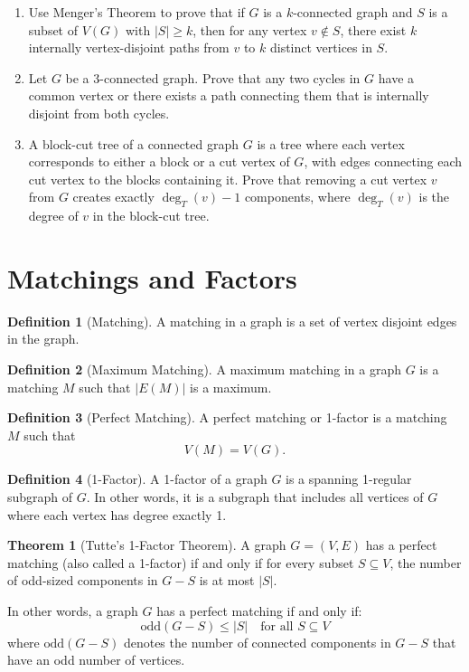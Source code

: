 \documentclass{article}
\theoremstyle{definition}
\newtheorem{theorem}{Theorem}
\newtheorem{definition}{Definition}
\begin{document}
\begin{enumerate}
\item Use Menger's Theorem to prove that if $G$ is a $k$-connected graph and $S$ is a subset of $V(G)$ with $|S| \geq k$, then for any vertex $v \not\in S$, there exist $k$ internally vertex-disjoint paths from $v$ to $k$ distinct vertices in $S$.

\item Let $G$ be a $3$-connected graph. Prove that any two cycles in $G$ have a common vertex or there exists a path connecting them that is internally disjoint from both cycles.

\item A block-cut tree of a connected graph $G$ is a tree where each vertex corresponds to either a block or a cut vertex of $G$, with edges connecting each cut vertex to the blocks containing it. Prove that removing a cut vertex $v$ from $G$ creates exactly $\deg_T(v) - 1$ components, where $\deg_T(v)$ is the degree of $v$ in the block-cut tree.
\end{enumerate}
\pagebreak
\newpage

\section{Matchings and Factors}

\begin{definition}[Matching]
A matching in a graph is a set of vertex disjoint edges in the graph.
\end{definition}

\begin{definition}[Maximum Matching]
A maximum matching in a graph $G$ is a matching $M$ such that $|E(M)|$ is a maximum.
\end{definition}

\begin{definition}[Perfect Matching]
 A perfect matching or 1-factor is a matching $M$ such that 
\[V(M) = V(G).\]
\end{definition}


\begin{definition}[1-Factor]
A 1-factor of a graph $G$ is a spanning 1-regular subgraph of $G$. In other words, it is a subgraph that includes all vertices of $G$ where each vertex has degree exactly 1.
\end{definition}

\begin{theorem}[Tutte's 1-Factor Theorem]
A graph $G = (V, E)$ has a perfect matching (also called a 1-factor) if and only if for every subset $S \subseteq V$, the number of odd-sized components in $G - S$ is at most $|S|$.

In other words, a graph $G$ has a perfect matching if and only if:
\[
\text{odd}(G - S) \leq |S| \quad \text{for all } S \subseteq V
\]
where $\text{odd}(G - S)$ denotes the number of connected components in $G - S$ that have an odd number of vertices.
\end{theorem}
\end{document}

